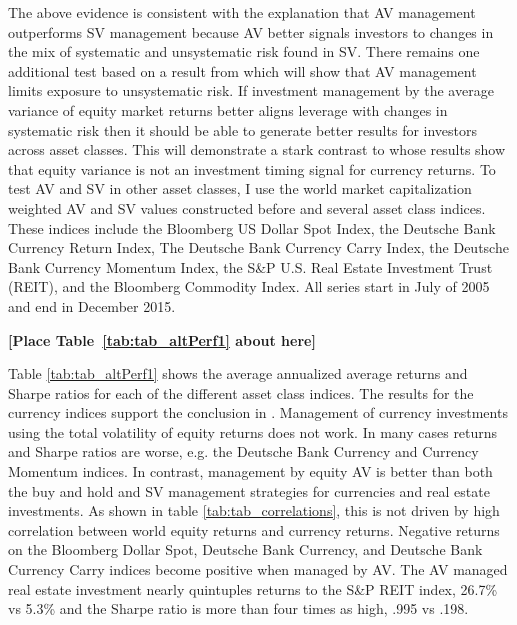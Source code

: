 The above evidence is consistent with the explanation that AV management outperforms SV management because AV better signals investors to changes in the mix of systematic and unsystematic risk found in SV. There remains one additional test based on a result from \citet{moreira_volatility-managed_2017} which will show that AV management limits exposure to unsystematic risk. If investment management by the average variance of equity market returns better aligns leverage with changes in systematic risk then it should be able to generate better results for investors across asset classes. This will demonstrate a stark contrast to \citet{moreira_volatility-managed_2017} whose results show that equity variance is not an investment timing signal for currency returns. To test AV and SV in other asset classes, I use the world market capitalization weighted AV and SV values constructed before and several asset class indices. These indices include the Bloomberg US Dollar Spot Index, the Deutsche Bank Currency Return Index, The Deutsche Bank Currency Carry Index, the Deutsche Bank Currency Momentum Index, the S\&P U.S. Real Estate Investment Trust (REIT), and the Bloomberg Commodity Index. All series start in July of 2005 and end in December 2015.

\bigskip
\centerline{\bf [Place Table~\ref{tab:tab_altPerf1} about here]}
\bigskip

Table \ref{tab:tab_altPerf1} shows the average annualized average returns and Sharpe ratios for each of the different asset class indices. The results for the currency indices support the conclusion in \citet{moreira_volatility-managed_2017}. Management of currency investments using the total volatility of equity returns does not work. In many cases returns and Sharpe ratios are worse, e.g. the Deutsche Bank Currency and Currency Momentum indices. In contrast, management by equity AV is better than both the buy and hold and SV management strategies for currencies and real estate investments. As shown in table \ref{tab:tab_correlations}, this is not driven by high correlation between world equity returns and currency returns. Negative returns on the Bloomberg Dollar Spot, Deutsche Bank Currency, and Deutsche Bank Currency Carry indices become positive when managed by AV. The AV managed real estate investment nearly quintuples returns to the S\&P REIT index, 26.7\% vs 5.3\% and the Sharpe ratio is more than four times as high, .995 vs .198.

